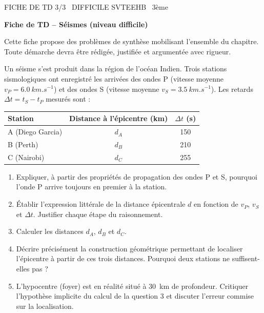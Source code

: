 \documentclass[11pt]{article}
\begin{document}
\begin{tcolorbox}[enhanced,colback=popink,colframe=popink,arc=10pt,boxrule=0pt,left=12pt,right=12pt,top=9pt,bottom=9pt]
{\color{white}\popxbold\small FICHE DE TD 3/3 \textbullet\ DIFFICILE \hfill SVTEEHB \textbullet\ 3ème\par}
\end{tcolorbox}
\vspace{4pt}
\textbf{Fiche de TD -- Séismes (niveau difficile)}

Cette fiche propose des problèmes de synthèse mobilisant l'ensemble du chapitre. Toute démarche devra être rédigée, justifiée et argumentée avec rigueur.

\begin{exercice}
Un séisme s'est produit dans la région de l'océan Indien. Trois stations sismologiques ont enregistré les arrivées des ondes P (vitesse moyenne $v_P = \SI{6,0}{km.s^{-1}}$) et des ondes S (vitesse moyenne $v_S = \SI{3,5}{km.s^{-1}}$). Les retards $\Delta t = t_S - t_P$ mesurés sont :

\begin{center}
\begin{tabular}{|l|c|c|}
\hline
\textbf{Station} & \textbf{Distance à l'épicentre (km)} & $\Delta t$ (s) \\
\hline
A (Diego Garcia) & $d_A$ & 150 \\
B (Perth) & $d_B$ & 210 \\
C (Nairobi) & $d_C$ & 255 \\
\hline
\end{tabular}
\end{center}

\begin{enumerate}
\item Expliquer, à partir des propriétés de propagation des ondes P et S, pourquoi l'onde P arrive toujours en premier à la station.
\item Établir l'expression littérale de la distance épicentrale $d$ en fonction de $v_P$, $v_S$ et $\Delta t$. Justifier chaque étape du raisonnement.
\item Calculer les distances $d_A$, $d_B$ et $d_C$.
\item Décrire précisément la construction géométrique permettant de localiser l'épicentre à partir de ces trois distances. Pourquoi deux stations ne suffisent-elles pas ?
\item L'hypocentre (foyer) est en réalité situé à \SI{30}{km} de profondeur. Critiquer l'hypothèse implicite du calcul de la question 3 et discuter l'erreur commise sur la localisation.
\end{enumerate}
\end{exercice}
\end{document}
